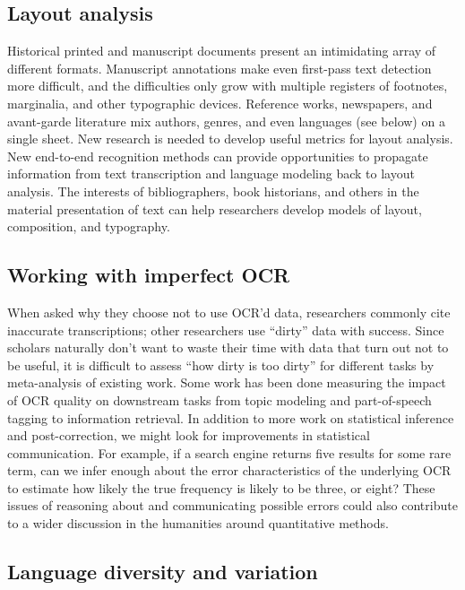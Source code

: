\documentclass[twoside,11pt]{report}
\begin{document}
\subsection{Layout analysis}

Historical printed and manuscript documents present an intimidating array of different formats. Manuscript annotations make even first-pass text detection more difficult, and the difficulties only grow with multiple registers of footnotes, marginalia, and other typographic devices. Reference works, newspapers, and avant-garde literature mix authors, genres, and even languages (see below) on a single sheet. New research is needed to develop useful metrics for layout analysis. New end-to-end recognition methods can provide opportunities to propagate information from text transcription and language modeling back to layout analysis. The interests of bibliographers, book historians, and others in the material presentation of text can help researchers develop models of layout, composition, and typography.

\subsection{Working with imperfect OCR}

When asked why they choose not to use OCR'd data, researchers commonly cite inaccurate transcriptions; other researchers use ``dirty'' data with success. Since scholars naturally don't want to waste their time with data that turn out not to be useful, it is difficult to assess ``how dirty is too dirty'' for different tasks by meta-analysis of existing work. Some work has been done measuring the impact of OCR quality on downstream tasks from topic modeling and part-of-speech tagging to information retrieval. In addition to more work on statistical inference and post-correction, we might look for improvements in statistical communication. For example, if a search engine returns five results for some rare term, can we infer enough about the error characteristics of the underlying OCR to estimate how likely the true frequency is likely to be three, or eight? These issues of reasoning about and communicating possible errors could also contribute to a wider discussion in the humanities around quantitative methods.

\subsection{Language diversity and variation}
\end{document}
